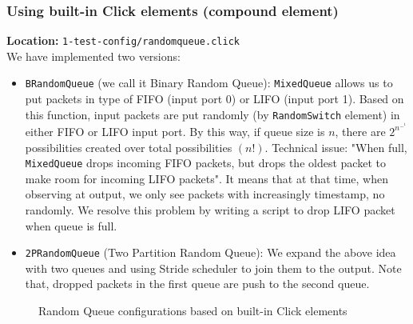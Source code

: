 \documentclass[a4paper]{article}
\begin{document}
  \subsubsection{Using built-in Click elements (compound element)}
  \textbf{Location:} \texttt{1-test-config/randomqueue.click} \\
  We have implemented two versions:
  \begin{itemize}
  	\item \texttt{BRandomQueue} (we call it Binary Random Queue): \texttt{MixedQueue} allows us to put packets in type of FIFO (input port 0) or LIFO (input port 1). Based on this function, input packets are put randomly (by \texttt{RandomSwitch} element) in either FIFO or LIFO input port. By this way, if queue size is $n$, there are $2^n^-^1$ possibilities created over total possibilities $(n!)$. Technical issue: "When full, \texttt{MixedQueue} drops incoming FIFO packets, but drops the  oldest  packet to make room for incoming LIFO packets". It means that at that time, when observing at output, we only see packets with increasingly timestamp, no randomly. We resolve this problem by writing a script to drop LIFO packet when queue is full.
  	\item \texttt{2PRandomQueue} (Two Partition Random Queue): We expand the above idea with two queues and using Stride scheduler to join them to the output. Note that, dropped packets in the first queue are push to the second queue.
  \end{itemize}
  \begin{figure}[ht]
      \centering
      
      
      \caption{Random Queue configurations based on built-in Click elements}
      \label{fig:clickrandomqueue}
  \end{figure}
\end{document}
